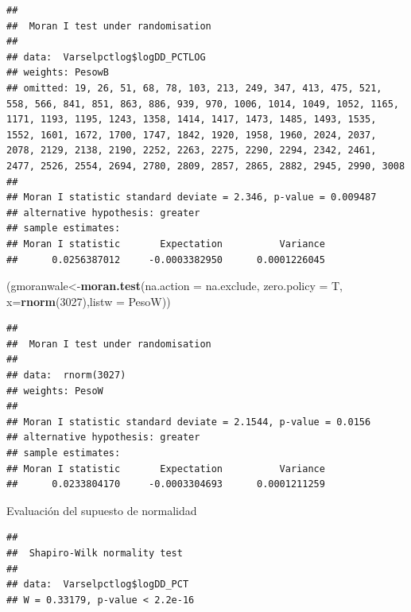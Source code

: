 \documentclass[11pt,]{article}
\newenvironment{Shaded}{\begin{snugshade}}{\end{snugshade}}
\newcommand{\KeywordTok}[1]{\textcolor[rgb]{0.13,0.29,0.53}{\textbf{#1}}}
\newcommand{\DataTypeTok}[1]{\textcolor[rgb]{0.13,0.29,0.53}{#1}}
\newcommand{\DecValTok}[1]{\textcolor[rgb]{0.00,0.00,0.81}{#1}}
\newcommand{\OperatorTok}[1]{\textcolor[rgb]{0.81,0.36,0.00}{\textbf{#1}}}
\newcommand{\NormalTok}[1]{#1}
\begin{document}
\begin{verbatim}
## 
##  Moran I test under randomisation
## 
## data:  Varselpctlog$logDD_PCTLOG  
## weights: PesowB 
## omitted: 19, 26, 51, 68, 78, 103, 213, 249, 347, 413, 475, 521, 558, 566, 841, 851, 863, 886, 939, 970, 1006, 1014, 1049, 1052, 1165, 1171, 1193, 1195, 1243, 1358, 1414, 1417, 1473, 1485, 1493, 1535, 1552, 1601, 1672, 1700, 1747, 1842, 1920, 1958, 1960, 2024, 2037, 2078, 2129, 2138, 2190, 2252, 2263, 2275, 2290, 2294, 2342, 2461, 2477, 2526, 2554, 2694, 2780, 2809, 2857, 2865, 2882, 2945, 2990, 3008   
## 
## Moran I statistic standard deviate = 2.346, p-value = 0.009487
## alternative hypothesis: greater
## sample estimates:
## Moran I statistic       Expectation          Variance 
##      0.0256387012     -0.0003382950      0.0001226045
\end{verbatim}

\begin{Shaded}
\begin{Highlighting}[]
\NormalTok{(gmoranwale<-}\KeywordTok{moran.test}\NormalTok{(}\DataTypeTok{na.action =}\NormalTok{ na.exclude, }\DataTypeTok{zero.policy =}\NormalTok{ T, }
             \DataTypeTok{x=}\KeywordTok{rnorm}\NormalTok{(}\DecValTok{3027}\NormalTok{),}\DataTypeTok{listw =}\NormalTok{ PesoW))}
\end{Highlighting}
\end{Shaded}

\begin{verbatim}
## 
##  Moran I test under randomisation
## 
## data:  rnorm(3027)  
## weights: PesoW    
## 
## Moran I statistic standard deviate = 2.1544, p-value = 0.0156
## alternative hypothesis: greater
## sample estimates:
## Moran I statistic       Expectation          Variance 
##      0.0233804170     -0.0003304693      0.0001211259
\end{verbatim}

Evaluación del supuesto de normalidad

\begin{Shaded}
\end{Shaded}

\begin{verbatim}
## 
##  Shapiro-Wilk normality test
## 
## data:  Varselpctlog$logDD_PCT
## W = 0.33179, p-value < 2.2e-16
\end{verbatim}
\end{document}
